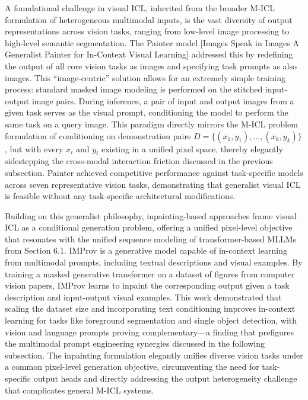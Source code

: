 \documentclass[11pt]{article}
\begin{document}
A foundational challenge in visual ICL, inherited from the broader M-ICL formulation of heterogeneous multimodal inputs, is the vast diversity of output representations across vision tasks, ranging from low-level image processing to high-level semantic segmentation. The Painter model {[}Images Speak in Images A Generalist Painter for In-Context Visual
Learning{]} addressed this by redefining the output of all core vision tasks as images and specifying task prompts as also images. This ``image-centric'' solution allows for an extremely simple training process: standard masked image modeling is performed on the stitched input-output image pairs. During inference, a pair of input and output images from a given task serves as the visual prompt, conditioning the model to perform the same task on a query image. This paradigm directly mirrors the M-ICL problem formulation of conditioning on demonstration pairs \(D = \{ (x_1, y_1), ..., (x_k, y_k) \}\), but with every \(x_i\) and \(y_i\) existing in a unified pixel space, thereby elegantly sidestepping the cross-modal interaction friction discussed in the previous subsection. Painter achieved competitive performance against task-specific models across seven representative vision tasks, demonstrating that generalist visual ICL is feasible without any task-specific architectural modifications.

Building on this generalist philosophy, inpainting-based approaches frame visual ICL as a conditional generation problem, offering a unified pixel-level objective that resonates with the unified sequence modeling of transformer-based MLLMs from Section 6.1. IMProv \cite{ref228} is a generative model capable of in-context learning from multimodal prompts, including textual descriptions and visual examples. By training a masked generative transformer on a dataset of figures from computer vision papers, IMProv learns to inpaint the corresponding output given a task description and input-output visual examples. This work demonstrated that scaling the dataset size and incorporating text conditioning improves in-context learning for tasks like foreground segmentation and single object detection, with vision and language prompts proving complementary---a finding that prefigures the multimodal prompt engineering synergies discussed in the following subsection. The inpainting formulation elegantly unifies diverse vision tasks under a common pixel-level generation objective, circumventing the need for task-specific output heads and directly addressing the output heterogeneity challenge that complicates general M-ICL systems.
\end{document}

